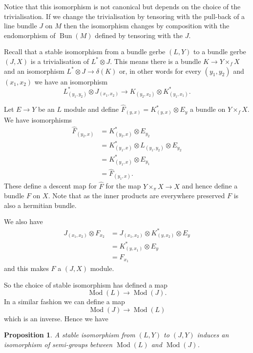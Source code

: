 \documentclass[a4paper,reqno]{amsart}
\DeclareMathOperator{\Mod}{Mod}
\DeclareMathOperator{\Bun}{Bun}
\theoremstyle{plain}
\newtheorem{proposition}[theorem]{Proposition}
\theoremstyle{definition}
\theoremstyle{remark}
\numberwithin{equation}{section}
\numberwithin{figure}{section}
\newcommand{\<}{\langle}
\renewcommand{\>}{\rangle}
\begin{document}
Notice that this isomorphism is not canonical but depends on the choice
of the trivialisation. If we change the trivialisation by tensoring
with the pull-back of a line bundle $J$ on $M$ then the isomorphism changes
by composition with the endomorphism of $\Bun(M)$ defined by tensoring
with the $J$.

Recall that a stable isomorphism from a bundle gerbe $(L, Y)$
to a bundle gerbe $(J, X)$ is a trivialisation of $L^*\otimes J$. This
means there is a bundle $K \to Y \times_f X$ and an isomorphism
$ L^*\otimes J \to \delta(K)$ or, in other words for
every $(y_1, y_2)$ and $(x_1, x_2)$ we have an isomorphism
$$
     L_{(y_1, y_2)}^*\otimes J_{(x_1, x_2)}
\to K_{(y_2, x_2)} \otimes K_{(y_1, x_1)}^*.
$$

Let $E \to Y$ be an $L$ module and define $\hat F_{(y, x)} = K_{(y,x)}^* \otimes
E_y$ a bundle on $Y \times_f X$.   We have isomorphisms
\begin{align*}
\hat F_{(y_2, x)} &= K_{(y_2,x)}^* \otimes E_{y_2}\\
                      &= K_{(y_1, x)}^* \otimes L_{(y_1, y_2)} \otimes 
E_{y_2} \\
                      &= K_{(y_1, x)}^* \otimes E_{y_1} \\
                      &= \hat F_{(y_1, x)}.
\end{align*}
These define   a descent map
for $\hat F$ for the map $Y \times_\pi X \to X$
and hence define a bundle $F$ on $X$.  Note that
as the inner products are everywhere preserved $F$ is also
a hermitian bundle.

We also have
\begin{align*}
J_{(x_1, x_2)} \otimes F_{x_2} &=J_{(x_1, x_2)} \otimes K_{(y,
x_2)}^*\otimes E_y \\
                         &= K_{(y, x_1)}^* \otimes E_y \\
                         & = F_{x_1}
\end{align*}
and this makes $F$ a $(J, X)$ module.

So the choice of stable isomorphism has defined a map
$$
\Mod(L) \to \Mod(J).
$$
In a similar fashion we can define a map
$$
\Mod(J) \to \Mod(L)
$$
which is an inverse.  Hence we have


\begin{proposition}
\label{prop:module}
A stable isomorphism from $(L, Y)$ to
$(J, Y)$ induces an isomorphism of semi-groups
between $\Mod(L)$ and $\Mod(J)$.
\end{proposition}
\end{document}
